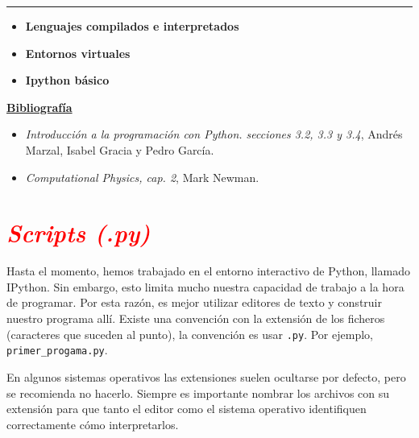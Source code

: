 \documentclass[12pt]{article}
\begin{document}
		\thispagestyle{firstpage}
		\vspace*{1.5cm}
	
	\begin{center}
		\rule{\textwidth}{0.4pt}
	\end{center}
	
	\begin{itemize}[leftmargin=*,label=\textcolor{red}{\ensuremath{\blacktriangleright}}]
		\item \textbf{Lenguajes compilados e interpretados}
		\item \textbf{Entornos virtuales}
		\item \textbf{Ipython básico}
	\end{itemize}
	
	\noindent
	\textbf{\underline{Bibliografía}}
	\begin{itemize}[leftmargin=*, label={\textcolor{blue}{$\bullet$}}]
		\item \textit{Introducción a la programación con Python. secciones 3.2, 3.3 y 3.4}, Andrés Marzal, Isabel Gracia y Pedro García.
		\item \textit{Computational Physics, cap. 2}, Mark Newman.
	\end{itemize}
     
    

\section*{\textcolor{red}{\textit{Scripts (.py)}}}
	Hasta el momento, hemos trabajado en el entorno interactivo de Python, llamado IPython.
    Sin embargo, esto limita mucho nuestra capacidad de trabajo a la hora de programar. Por esta 
    razón, es mejor utilizar editores de texto y construir nuestro programa allí. Existe una convención con 
    la extensión de los ficheros (caracteres que suceden al punto), la convención es usar 
    \lstinline|.py|. Por ejemplo, \lstinline|primer_progama.py|. 
    
    En algunos sistemas operativos las extensiones suelen ocultarse por defecto, pero se recomienda 
    no hacerlo. Siempre es importante nombrar los archivos con su extensión para que tanto el editor 
    como el sistema operativo identifiquen correctamente cómo interpretarlos.  
\end{document}
